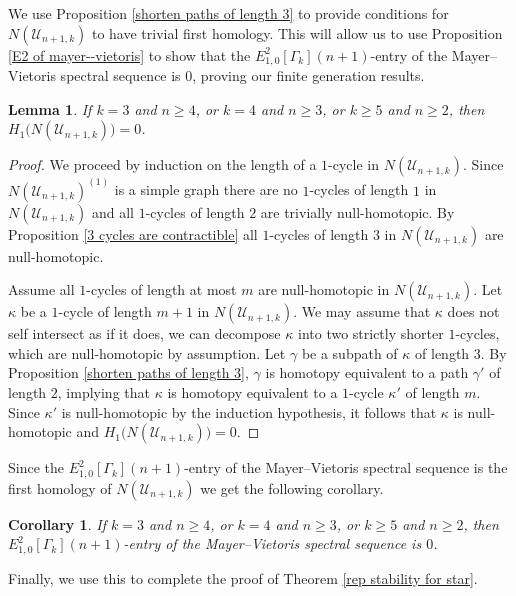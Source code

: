 \documentclass[pagebackref,colorlinks,citecolor=blue,linkcolor=blue,urlcolor=blue,filecolor=blue]{article}
\newtheorem{lem}[thm]{Lemma}
\newtheorem{cor}[thm]{Corollary}
\theoremstyle{definition}\newtheorem{definition}[thm]{Definition}
\theoremstyle{definition}
\begin{document}
We use Proposition \ref{shorten paths of length 3} to provide conditions for $N(\mathcal{U}_{n+1, k})$ to have trivial first homology.
This will allow us to use Proposition \ref{E2 of mayer--vietoris} to show that the $E^{2}_{1,0}[\Gamma_{k}](n+1)$-entry of the Mayer--Vietoris spectral sequence is $0$, proving our finite generation results.

\begin{lem}\label{contract 1-cycles}
If $k=3$ and $n\ge 4$, or $k=4$ and $n\ge 3$, or $k\ge 5$ and $n\ge 2$, then $H_{1}\big(N(\mathcal{U}_{n+1, k})\big)=0$.
\end{lem}

\begin{proof}
We proceed by induction on the length of a $1$-cycle in $N(\mathcal{U}_{n+1, k})$. 
Since $N(\mathcal{U}_{n+1, k})^{(1)}$ is a simple graph there are no $1$-cycles of length $1$ in $N(\mathcal{U}_{n+1, k})$ and all $1$-cycles of length $2$ are trivially null-homotopic.
By Proposition \ref{3 cycles are contractible} all $1$-cycles of length $3$ in $N(\mathcal{U}_{n+1, k})$ are null-homotopic.

Assume all $1$-cycles of length at most $m$ are null-homotopic in $N(\mathcal{U}_{n+1, k})$.
Let $\kappa$ be a $1$-cycle of length $m+1$ in $N(\mathcal{U}_{n+1, k})$.
We may assume that $\kappa$ does not self intersect as if it does, we can decompose $\kappa$ into two strictly shorter $1$-cycles, which are null-homotopic by assumption. 
Let $\gamma$ be a subpath of $\kappa$ of length $3$.
By Proposition \ref{shorten paths of length 3}, $\gamma$ is homotopy equivalent to a path $\gamma'$ of length $2$, implying that $\kappa$ is homotopy equivalent to a $1$-cycle $\kappa'$ of length $m$. 
Since $\kappa'$ is null-homotopic by the induction hypothesis, it follows that $\kappa$ is null-homotopic and $H_{1}\big(N(\mathcal{U}_{n+1, k})\big)=0$.
\end{proof}

Since the $E^{2}_{1,0}[\Gamma_{k}](n+1)$-entry of the Mayer--Vietoris spectral sequence is the first homology of $N(\mathcal{U}_{n+1, k})$ we get the following corollary.

\begin{cor}\label{E210 is 0}
If $k=3$ and $n\ge 4$, or $k=4$ and $n\ge 3$, or $k\ge 5$ and $n\ge 2$, then $E^{2}_{1,0}[\Gamma_{k}](n+1)$-entry of the Mayer--Vietoris spectral sequence is $0$.
\end{cor}

Finally, we use this to complete the proof of Theorem \ref{rep stability for star}.
\end{document}
